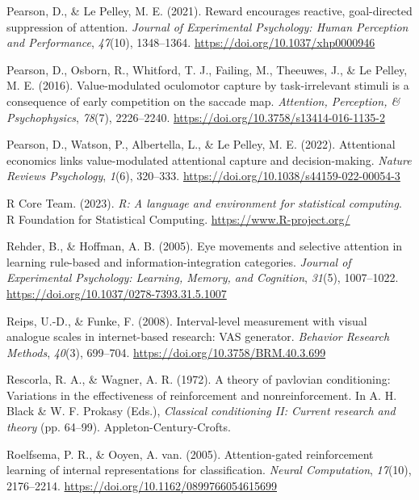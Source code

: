 \documentclass[
  man,
  floatsintext,
  longtable,
  nolmodern,
  notxfonts,
  notimes,
  mask,
  colorlinks=true,linkcolor=blue,citecolor=blue,urlcolor=blue]{apa7}
\newlength{\cslhangindent}
\newenvironment{CSLReferences}[2] %
 {\begin{list}{}{%
  \setlength{\itemindent}{0pt}
  \setlength{\leftmargin}{0pt}
  \setlength{\parsep}{0pt}
  \ifodd #1
   \setlength{\leftmargin}{\cslhangindent}
   \setlength{\itemindent}{-1\cslhangindent}
  \fi
  \setlength{\itemsep}{#2\baselineskip}}}
 {\end{list}}
\begin{document}
\begin{CSLReferences}{1}{0}
Pearson, D., \& Le Pelley, M. E. (2021). Reward encourages reactive,
goal-directed suppression of attention. \emph{Journal of Experimental
Psychology: Human Perception and Performance}, \emph{47}(10),
1348--1364. \url{https://doi.org/10.1037/xhp0000946}

Pearson, D., Osborn, R., Whitford, T. J., Failing, M., Theeuwes, J., \&
Le Pelley, M. E. (2016). Value-modulated oculomotor capture by
task-irrelevant stimuli is a consequence of early competition on the
saccade map. \emph{Attention, Perception, \& Psychophysics},
\emph{78}(7), 2226--2240.
\url{https://doi.org/10.3758/s13414-016-1135-2}

Pearson, D., Watson, P., Albertella, L., \& Le Pelley, M. E. (2022).
Attentional economics links value-modulated attentional capture and
decision-making. \emph{Nature Reviews Psychology}, \emph{1}(6),
320--333. \url{https://doi.org/10.1038/s44159-022-00054-3}

R Core Team. (2023). \emph{R: A language and environment for statistical
computing}. R Foundation for Statistical Computing.
\url{https://www.R-project.org/}

Rehder, B., \& Hoffman, A. B. (2005). Eye movements and selective
attention in learning rule-based and information-integration categories.
\emph{Journal of Experimental Psychology: Learning, Memory, and
Cognition}, \emph{31}(5), 1007--1022.
\url{https://doi.org/10.1037/0278-7393.31.5.1007}

Reips, U.-D., \& Funke, F. (2008). Interval-level measurement with
visual analogue scales in internet-based research: VAS generator.
\emph{Behavior Research Methods}, \emph{40}(3), 699--704.
\url{https://doi.org/10.3758/BRM.40.3.699}

Rescorla, R. A., \& Wagner, A. R. (1972). A theory of pavlovian
conditioning: Variations in the effectiveness of reinforcement and
nonreinforcement. In A. H. Black \& W. F. Prokasy (Eds.),
\emph{Classical conditioning II: Current research and theory} (pp.
64--99). Appleton-Century-Crofts.

Roelfsema, P. R., \& Ooyen, A. van. (2005). Attention-gated
reinforcement learning of internal representations for classification.
\emph{Neural Computation}, \emph{17}(10), 2176--2214.
\url{https://doi.org/10.1162/0899766054615699}


\end{CSLReferences}
\end{document}
